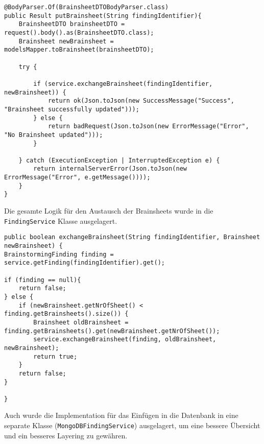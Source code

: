 \begin{lstlisting}[caption={PutBrainsheet nach Refactoring}, label=putBrainsheetNachRef]
@BodyParser.Of(BrainsheetDTOBodyParser.class)
public Result putBrainsheet(String findingIdentifier){
    BrainsheetDTO brainsheetDTO = request().body().as(BrainsheetDTO.class);
    Brainsheet newBrainsheet = modelsMapper.toBrainsheet(brainsheetDTO);

    try {

        if (service.exchangeBrainsheet(findingIdentifier, newBrainsheet)) {
            return ok(Json.toJson(new SuccessMessage("Success", "Brainsheet successfully updated")));
        } else {
            return badRequest(Json.toJson(new ErrorMessage("Error", "No Brainsheet updated")));
        }

    } catch (ExecutionException | InterruptedException e) {
        return internalServerError(Json.toJson(new ErrorMessage("Error", e.getMessage())));
    }
}
\end{lstlisting}

Die gesamte Logik für den Austausch der Brainsheets wurde in die \texttt{FindingService} Klasse ausgelagert.

\begin{lstlisting}[caption={Exchange Brainsheet im Business Layer}, label=exchangeBrainsheetBusinessLayer]
public boolean exchangeBrainsheet(String findingIdentifier, Brainsheet newBrainsheet) {
BrainstormingFinding finding = service.getFinding(findingIdentifier).get();

if (finding == null){
    return false;
} else {
    if (newBrainsheet.getNrOfSheet() < finding.getBrainsheets().size()) {
        Brainsheet oldBrainsheet = finding.getBrainsheets().get(newBrainsheet.getNrOfSheet());
        service.exchangeBrainsheet(finding, oldBrainsheet, newBrainsheet);
        return true;
    }
    return false;
}

}
\end{lstlisting}

Auch wurde die Implementation für das Einfügen in die Datenbank in eine separate Klasse (\texttt{MongoDBFindingService}) ausgelagert, um eine bessere Übersicht und ein besseres Layering zu gewähren.

